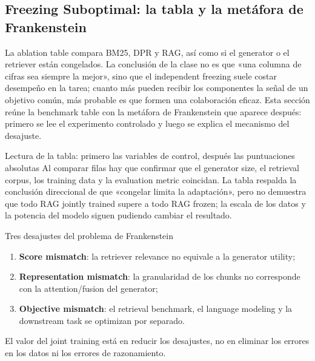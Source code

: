 \subsection{Freezing Suboptimal: la tabla y la metáfora de Frankenstein}

La ablation table compara BM25, DPR y RAG, así como si el generator o el retriever están congelados. La conclusión de la clase no es que «una columna de cifras sea siempre la mejor», sino que el independent freezing suele costar desempeño en la tarea; cuanto más pueden recibir los componentes la señal de un objetivo común, más probable es que formen una colaboración eficaz. Esta sección reúne la benchmark table con la metáfora de Frankenstein que aparece después: primero se lee el experimento controlado y luego se explica el mecanismo del desajuste.


\begin{knowledgebox}{Lectura de la tabla: primero las variables de control, después las puntuaciones absolutas}
Al comparar filas hay que confirmar que el generator size, el retrieval corpus, los training data y la evaluation metric coincidan. La tabla respalda la conclusión direccional de que «congelar limita la adaptación», pero no demuestra que todo RAG jointly trained supere a todo RAG frozen; la escala de los datos y la potencia del modelo siguen pudiendo cambiar el resultado.
\end{knowledgebox}


\begin{warningbox}{Tres desajustes del problema de Frankenstein}
\begin{enumerate}
  \item \textbf{Score mismatch}: la retriever relevance no equivale a la generator utility;
  \item \textbf{Representation mismatch}: la granularidad de los chunks no corresponde con la attention/fusion del generator;
  \item \textbf{Objective mismatch}: el retrieval benchmark, el language modeling y la downstream task se optimizan por separado.
\end{enumerate}
El valor del joint training está en reducir los desajustes, no en eliminar los errores en los datos ni los errores de razonamiento.
\end{warningbox}

